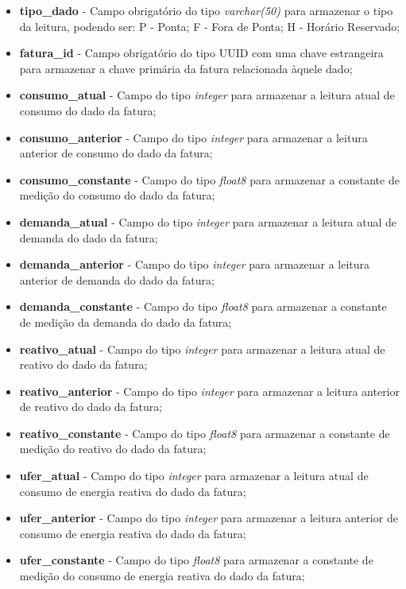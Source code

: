 \begin{itemize}
    \item \textbf{tipo\_dado} - Campo obrigatório do tipo \textit{varchar(50)} para armazenar o tipo da leitura, podendo ser:
    \subitem P - Ponta;
    \subitem F - Fora de Ponta;
    \subitem H - Horário Reservado;
    \item \textbf{fatura\_id} - Campo obrigatório do tipo UUID com uma chave estrangeira para armazenar a chave primária da fatura relacionada àquele dado;
    
    \item \textbf{consumo\_atual} - Campo do tipo \textit{integer} para armazenar a leitura atual de consumo do dado da fatura;
    \item \textbf{consumo\_anterior} - Campo do tipo \textit{integer} para armazenar a leitura anterior de consumo do dado da fatura;
    \item \textbf{consumo\_constante} - Campo do tipo \textit{float8} para armazenar a constante de medição do consumo do dado da fatura;
    
    \item \textbf{demanda\_atual} - Campo do tipo \textit{integer} para armazenar a leitura atual de demanda do dado da fatura;
    \item \textbf{demanda\_anterior} - Campo do tipo \textit{integer} para armazenar a leitura anterior de demanda do dado da fatura;
    \item \textbf{demanda\_constante} - Campo do tipo \textit{float8} para armazenar a constante de medição da demanda do dado da fatura;
    
    \item \textbf{reativo\_atual} - Campo do tipo \textit{integer} para armazenar a leitura atual de reativo do dado da fatura;
    \item \textbf{reativo\_anterior} - Campo do tipo \textit{integer} para armazenar a leitura anterior de reativo do dado da fatura;
    \item \textbf{reativo\_constante} - Campo do tipo \textit{float8} para armazenar a constante de medição do reativo do dado da fatura;
    
    \item \textbf{ufer\_atual} - Campo do tipo \textit{integer} para armazenar a leitura atual de consumo de energia reativa do dado da fatura;
    \item \textbf{ufer\_anterior} - Campo do tipo \textit{integer} para armazenar a leitura anterior de consumo de energia reativa do dado da fatura;
    \item \textbf{ufer\_constante} - Campo do tipo \textit{float8} para armazenar a constante de medição do consumo de energia reativa do dado da fatura;
    

\end{itemize}
